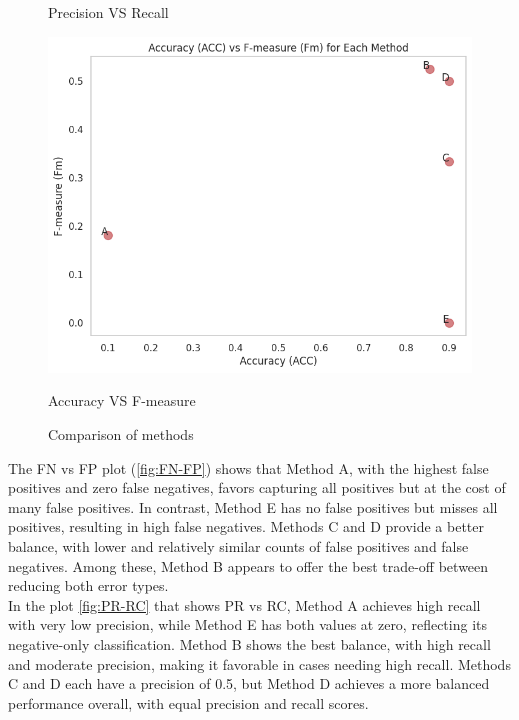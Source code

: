 \documentclass{article}
\begin{document}
\begin{figure}[H]
\begin{minipage}{0.37\textwidth}
		\caption{Precision VS Recall}
		\label{fig:PR-RC}
	\end{minipage}
	\hspace{0.03\textwidth} %
	\begin{minipage}{0.37\textwidth}
		\centering
		\includegraphics[width=\textwidth]{images/ACC-Fm.png}
		\caption{Accuracy VS F-measure}
		\label{fig:ACC-Fm}
	\end{minipage}
	
	\caption{Comparison of methods}
	\label{fig:comparison}
\end{figure}


The FN vs FP plot (\ref{fig:FN-FP}) shows that Method A, with the highest false positives and zero false negatives, favors capturing all positives but at the cost of many false positives. In contrast, Method E has no false positives but misses all positives, resulting in high false negatives. Methods C and D provide a better balance, with lower and relatively similar counts of false positives and false negatives. Among these, Method B appears to offer the best trade-off between reducing both error types.
\\

In the plot \ref{fig:PR-RC} that shows PR vs RC, Method A achieves high recall with very low precision, while Method E has both values at zero, reflecting its negative-only classification. Method B shows the best balance, with high recall and moderate precision, making it favorable in cases needing high recall. Methods C and D each have a precision of 0.5, but Method D achieves a more balanced performance overall, with equal precision and recall scores.
\\
\end{document}
